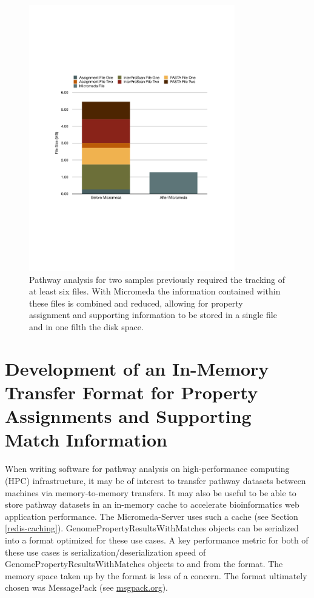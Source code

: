 \begin{figure}[!ht]
  \centering
	\includegraphics[width=0.80\textwidth]{media/micromeda_file_size.pdf}
	 \caption{Pathway analysis for two samples previously required the tracking of at least six files. With Micromeda the information contained within these files is combined and reduced, allowing for property assignment and supporting information to be stored in a single file and in one filth the disk space.}
	 \label{fig:micromedafilesize}
\end{figure}

\section{Development of an In-Memory Transfer Format for Property Assignments and Supporting Match Information} \label{msgpack}

When writing software for pathway analysis on high-performance computing (HPC) infrastructure, it may be of interest to transfer pathway datasets between machines via memory-to-memory transfers. It may also be useful to be able to store pathway datasets in an in-memory cache to accelerate bioinformatics web application performance. The Micromeda-Server uses such a cache (see Section \ref{redis-caching}). GenomePropertyResultsWithMatches objects can be serialized into a format optimized for these use cases. A key performance metric for both of these use cases is serialization/deserialization speed of GenomePropertyResultsWithMatches objects to and from the format. The memory space taken up by the format is less of a concern. The format ultimately chosen was MessagePack  \cite{furuhashi2013messagepack}(see \href{msgpack.org}{msgpack.org}).

